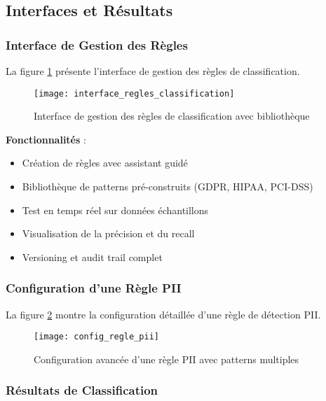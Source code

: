 \subsection{Interfaces et Résultats}

\subsubsection{Interface de Gestion des Règles}

La figure \ref{fig:interface_regles_classification} présente l'interface de gestion des règles de classification.

\begin{figure}[htpb]
\centering
\texttt{[image: interface\_regles\_classification]}
\caption{Interface de gestion des règles de classification avec bibliothèque}
\label{fig:interface_regles_classification}
\end{figure}

\textbf{Fonctionnalités} :
\begin{itemize}
    \item Création de règles avec assistant guidé
    \item Bibliothèque de patterns pré-construits (GDPR, HIPAA, PCI-DSS)
    \item Test en temps réel sur données échantillons
    \item Visualisation de la précision et du recall
    \item Versioning et audit trail complet
\end{itemize}

\subsubsection{Configuration d'une Règle PII}

La figure \ref{fig:config_regle_pii} montre la configuration détaillée d'une règle de détection PII.

\begin{figure}[htpb]
\centering
\texttt{[image: config\_regle\_pii]}
\caption{Configuration avancée d'une règle PII avec patterns multiples}
\label{fig:config_regle_pii}
\end{figure}

\subsubsection{Résultats de Classification}

